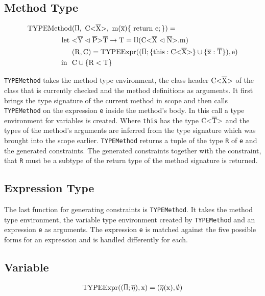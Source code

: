 \subsection{Method Type}

\begin{align*}
    \text{TYPEMethod}&(\sprod{0.7}, \ \text{C<} \ot{X} \text{>}, \ \text{m} ( \ot{x} ) \{ \ \text{return e}; \} ) = \\
    \text{let} \ &\yp \oto{\text{T}} = \sprod{0.7} ( \cm ) \\
    & ( \text{R}, \text{C} ) = \text{TYPEExpr} (( \sprod{0.7}; \{ \text{this} : \text{C<} \ot{X} \text{>} \} \cup \{ \ot{x} : \ot{T} \} ) , \text{e} ) \\
    \text{in} \ \  & \text{C} \cup \{ \text{R} < \text{T} \}\\
\end{align*}

\verb|TYPEMethod| takes the method type environment, the class header $\text{C<}\overline{\text{X}}\text{>}$ of the class that is currently checked and the method definitions as arguments.
It first brings the type signature of the current method in scope and then calls \verb|TYPEMethod| on the expression \verb|e| inside the method's body. In this call a type environment for variables is created. Where \verb|this| has the type $\text{C<}\overline{\text{T}}\text{>}$ and the types of the method's arguments are inferred from the type signature which was brought into the scope earlier.
\verb|TYPEMethod| returns a tuple of the type \verb|R| of \verb|e| and the generated constraints. The generated constraints together with the constraint, that \verb|R| must be a subtype of the return type of the method signature is returned.

\subsection{Expression Type}
The last function for generating constraints is \verb|TYPEMethod|. It takes the method type environment, the variable type environment created by \verb|TYPEMethod| and an expression \verb|e| as arguments.
The expression \verb|e| is matched against the five possible forms for an expression and is handled differently for each.

\subsection{Variable}

\begin{align*}
    \texpr{\text{x}} = (\overline{\eta} (\text{x}), \emptyset)\\
\end{align*}

